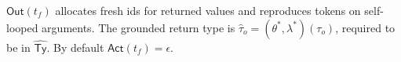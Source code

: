 \documentclass[sigconf]{acmart}
\begin{document}
$\mathsf{Out}(t_f)$ allocates fresh ids for returned values and reproduces tokens on self-looped arguments.
The grounded return type is $\hat\tau_o=(\theta^{*},\lambda^{*})(\tau_o)$, required to be in $\widehat{\mathsf{Ty}}$.
By default $\mathsf{Act}(t_f)=\epsilon$.




\end{document}
